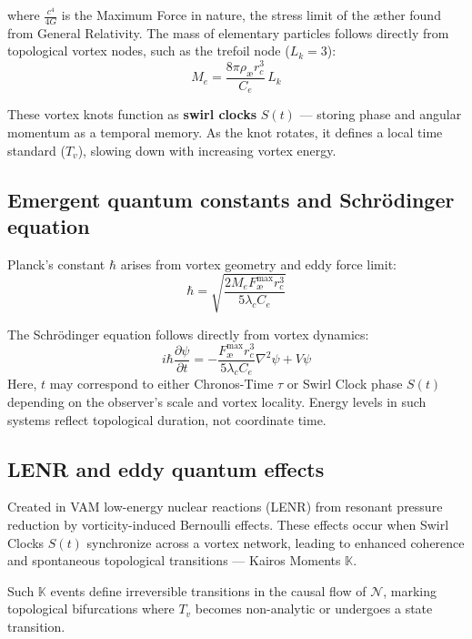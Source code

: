 \documentclass[preprint]{revtex4-2}
\begin{document}
where $\frac{c^4}{4G}$ is the Maximum Force in nature, the stress limit of the æther found from General Relativity.
The mass of elementary particles follows directly from topological vortex nodes, such as the trefoil node ($L_k=3$):
\begin{equation}
    M_e = \frac{8\pi \rho_\text{\ae} r_c^3}{C_e}\, L_k
\end{equation}

These vortex knots function as \textbf{swirl clocks} $S(t)$ — storing phase and angular momentum as a temporal memory. As the knot rotates, it defines a local time standard ($T_v$), slowing down with increasing vortex energy.


\subsection*{Emergent quantum constants and Schrödinger equation}

Planck's constant $\hbar$ arises from vortex geometry and eddy force limit:
\begin{equation}
    \hbar = \sqrt{\frac{2 M_e F^{\text{max}}_{\text{\ae}} r_c^3}{5 \lambda_c C_e}}
\end{equation}

The Schrödinger equation follows directly from vortex dynamics:
\begin{equation}
    i \hbar \frac{\partial \psi}{\partial t} = -\frac{F^{\text{max}}_{\text{\ae}} r_c^3}{5 \lambda_c C_e}\nabla^2 \psi + V\psi
\end{equation}
Here, $t$ may correspond to either Chronos-Time $\tau$ or Swirl Clock phase $S(t)$ depending on the observer's scale and vortex locality. Energy levels in such systems reflect topological duration, not coordinate time.


\subsection*{LENR and eddy quantum effects}

Created in VAM low-energy nuclear reactions (LENR) from resonant pressure reduction by vorticity-induced Bernoulli effects. These effects occur when Swirl Clocks $S(t)$ synchronize across a vortex network, leading to enhanced coherence and spontaneous topological transitions — Kairos Moments $\mathbb{K}$.

Such $\mathbb{K}$ events define irreversible transitions in the causal flow of $\mathcal{N}$, marking topological bifurcations where $T_v$ becomes non-analytic or undergoes a state transition.
\end{document}
